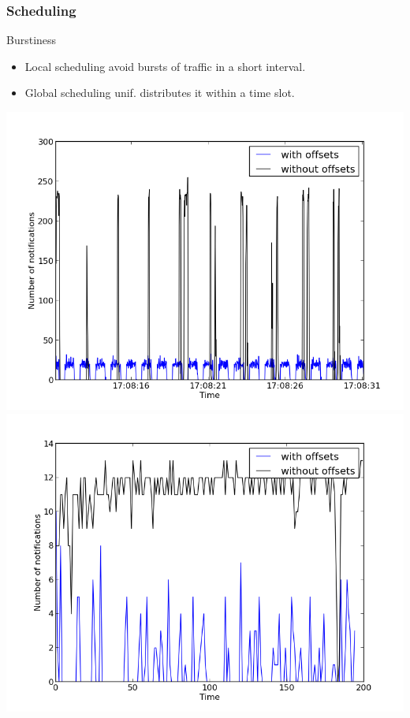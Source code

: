 \documentclass[]{prezentare}
\begin{document}
\begin{frame}
	\frametitle{Scheduling}
	\begin{block}{Burstiness}
	\begin{itemize}
	\item Local scheduling avoid bursts of traffic in a short interval. 
	\item<2> Global scheduling unif. distributes it within a time slot.
	\end{itemize}
	\vspace{-5mm}
	\begin{center}
		{\includegraphics[scale=.375]{../Images/burstiness}}
		{\includegraphics[scale=.375]{../Images/burstiness_hires}}
	\end{center}
	\end{block}
\end{frame}
\end{document}
